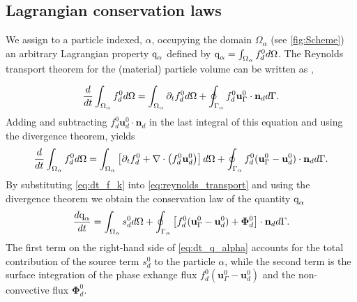 \subsection{Lagrangian conservation laws}



We assign to a particle indexed, $\alpha$, occupying the domain $\Omega_\alpha$ (see \ref{fig:Scheme}) an arbitrary Lagrangian property $\text q_\alpha$ defined by $\text q_\alpha  = \int_{\Omega_{\alpha}}  f_d^0 d\Omega$. The Reynolds transport theorem for the (material) particle volume can be written as \citep{leal2007advanced},

\begin{equation}
   \ddt  \intO{f_d^0}
    = \intO{\pddt f_d^0 }\\
    + \intS{ f_d^0 \textbf{u}_\Gamma^0\cdot \textbf{n}_d }.
    \label{eq:reynolds_transport0}
\end{equation}
Adding and subtracting $f_d^0 \textbf{u}_d^0\cdot \textbf{n}_d$ in the last integral of this equation and using the divergence theorem, yields
\begin{equation}
    \ddt  \intO{f_d^0}
    = \intO{\left[ \pddt f_d^0 + \div\left(f_d^0\textbf{u}_d^0\right) \right]}\\
    + \intS{ f_d^0 (\textbf{u}_\Gamma^0-\textbf{u}_d^0)\cdot \textbf{n}_d }.
    \label{eq:reynolds_transport}
\end{equation}
By substituting \ref{eq:dt_f_k} into \ref{eq:reynolds_transport} and using the divergence theorem we obtain the conservation law of the quantity $\text q_\alpha$ %
\begin{equation}
    \frac{d \text q_\alpha}{d t}
    = \intO{ s_d^0 }
    + \intS{ \left[
        f_d^0 (\textbf{u}_\Gamma^0-\textbf{u}_d^0) 
        + \mathbf{\Phi}_d^0 
        \right] \cdot \textbf{n}_d }.
    \label{eq:dt_q_alpha}
\end{equation}
The first term on the right-hand side of \ref{eq:dt_q_alpha} accounts for the total contribution of the source term $s_d^0$ to the particle $\alpha$,
while the second term is the surface integration of the phase exhange flux $f_d^0 (\textbf{u}_\Gamma^0-\textbf{u}_d^0)$ and the non-convective flux $\mathbf{\Phi}_d^0$.

